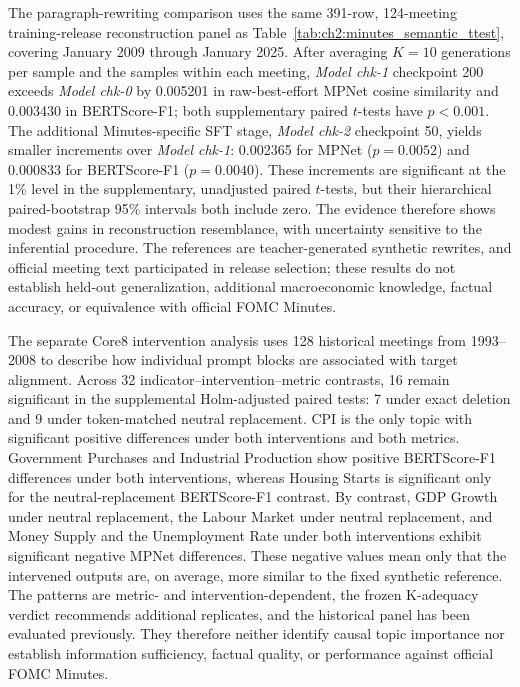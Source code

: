 The paragraph-rewriting comparison uses the same 391-row, 124-meeting
training-release reconstruction panel as
Table~\ref{tab:ch2:minutes_semantic_ttest}, covering January 2009 through
January 2025. After averaging \(K=10\) generations per sample and the
samples within each meeting, \textit{Model chk-1} checkpoint 200 exceeds
\textit{Model chk-0} by 0.005201 in raw-best-effort MPNet cosine similarity
and 0.003430 in BERTScore-F1; both supplementary paired \(t\)-tests have
\(p<0.001\). The additional Minutes-specific SFT stage,
\textit{Model chk-2} checkpoint 50, yields smaller increments over
\textit{Model chk-1}: 0.002365 for MPNet (\(p=0.0052\)) and 0.000833 for
BERTScore-F1 (\(p=0.0040\)). These increments are significant at the 1\%
level in the supplementary, unadjusted paired \(t\)-tests, but their
hierarchical paired-bootstrap 95\% intervals both include zero. The
evidence therefore shows modest gains in reconstruction resemblance, with
uncertainty sensitive to the inferential procedure. The references are
teacher-generated synthetic rewrites, and official meeting text participated
in release selection; these results do not establish held-out
generalization, additional macroeconomic knowledge, factual accuracy, or
equivalence with official FOMC Minutes.

The separate Core8 intervention analysis uses 128 historical meetings from
1993--2008 to describe how individual prompt blocks are associated with
target alignment. Across 32
indicator--intervention--metric contrasts, 16 remain significant in the
supplemental Holm-adjusted paired tests: 7 under exact deletion and 9 under
token-matched neutral replacement. CPI is the only topic with significant
positive differences under both interventions and both metrics. Government
Purchases and Industrial Production show positive BERTScore-F1 differences
under both interventions, whereas Housing Starts is significant only for the
neutral-replacement BERTScore-F1 contrast. By contrast, GDP Growth under
neutral replacement, the Labour Market under neutral replacement, and Money
Supply and the Unemployment Rate under both interventions exhibit significant
negative MPNet differences. These negative values mean only that the intervened
outputs are, on average, more similar to the fixed synthetic reference. The
patterns are metric- and intervention-dependent, the frozen K-adequacy verdict
recommends additional replicates, and the historical panel has been evaluated
previously. They therefore neither identify causal topic importance nor
establish information sufficiency, factual quality, or performance against
official FOMC Minutes.

